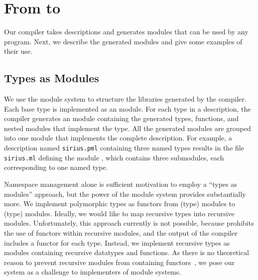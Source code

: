 \section{From \padsmlbig{} to \ocamlbig{}}
\label{sec:padsml-impl}
Our \padsml{} compiler takes descriptions and generates \ocaml{}
modules that can be used by any \ocaml{} program.  Next, we
describe the generated modules and give some examples of their use.

\subsection{Types as Modules}
\label{sec:gen-code}

We use the \ocaml{} module system to structure the libraries generated
by the \padsml{} compiler.  Each \padsml{} base type is implemented as
an \ocaml{} module.  For each \padsml{} type in a description, the
\padsml{} compiler generates an \ocaml{} module containing the
generated \ocaml{} types, functions, and nested modules that implement
the \padsml{} type.  All the generated modules are grouped into one
module that implements the complete description.  For example, a
\padsml{} description named \texttt{sirius.pml} containing three named
types results in the \ocaml{} file \texttt{sirius.ml} defining the
module , which contains three submodules, each
corresponding to one named type.

Namespace management alone is sufficient motivation to employ a
``types as modules'' approach, but the power of the \ml{} module
system provides substantially more.  We implement polymorphic
\padsml{} types as functors from (type) modules to (type) modules.
Ideally, we would like to map recursive \padsml{} types into recursive
modules.  Unfortunately, this approach currently is not possible, because
\ocaml{} prohibits the use of functors within recursive modules,
and the output of the \padsml{} compiler includes a functor for each
type.  Instead, we implement recursive types as modules containing
recursive datatypes and functions.  As there is no theoretical reason
to prevent recursive modules from containing functors~\cite{dreyer-thesis}, we
pose our system as a challenge to implementers of module systems.

